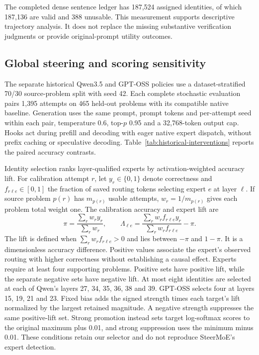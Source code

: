 The completed dense sentence ledger has 187,524 assigned identities, of which 187,136 are valid and 388 unusable.
%
This measurement supports descriptive trajectory analysis.
%
It does not replace the missing substantive verification judgments or provide original-prompt utility outcomes.
%

\subsection{Global steering and scoring sensitivity}

The separate historical Qwen3.5 and GPT-OSS policies use a dataset-stratified 70/30 source-problem split with seed 42.
%
Each complete stochastic evaluation pairs 1,395 attempts on 465 held-out problems with its compatible native baseline.
%
Generation uses the same prompt, prompt tokens and per-attempt seed within each pair, temperature 0.6, top-$p$ 0.95 and a 32,768-token output cap.
%
Hooks act during prefill and decoding with eager native expert dispatch, without prefix caching or speculative decoding.
%
Table~\ref{tab:historical-interventions} reports the paired accuracy contrasts.
%



Identity selection ranks layer-qualified experts by activation-weighted accuracy lift.
%
For calibration attempt $r$, let $y_r\in\{0,1\}$ denote correctness and $f_{r\ell e}\in[0,1]$ the fraction of saved routing tokens selecting expert $e$ at layer $\ell$.
%
If source problem $p(r)$ has $m_{p(r)}$ usable attempts, $w_r=1/m_{p(r)}$ gives each problem total weight one.
%
The calibration accuracy and expert lift are
\begin{equation}
\pi=\frac{\sum_r w_r y_r}{\sum_r w_r},\qquad
\Lambda_{\ell e}=\frac{\sum_r w_r f_{r\ell e}y_r}
                           {\sum_r w_r f_{r\ell e}}-\pi.
\end{equation}
The lift is defined when $\sum_r w_r f_{r\ell e}>0$ and lies between $-\pi$ and $1-\pi$.
%
It is a dimensionless accuracy difference.
%
Positive values associate the expert's observed routing with higher correctness without establishing a causal effect.
%
Experts require at least four supporting problems.
%
Positive sets have positive lift, while the separate negative sets have negative lift.
%
At most eight identities are selected at each of Qwen's layers 27, 34, 35, 36, 38 and 39.
%
GPT-OSS selects four at layers 15, 19, 21 and 23.
%
Fixed bias adds the signed strength times each target's lift normalized by the largest retained magnitude.
%
A negative strength suppresses the same positive-lift set.
%
Strong promotion instead sets target log-softmax scores to the original maximum plus 0.01, and strong suppression uses the minimum minus 0.01.
%
These conditions retain our selector and do not reproduce SteerMoE's expert detection.
%

